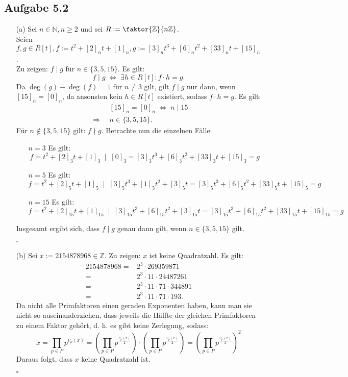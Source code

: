 \documentclass[12pt]{article}
\newcommand{\QED}{\begin{flushright} $\square$ \end{flushright}}
\newcommand{\df}{\enspace\Longrightarrow\enspace}
\newcommand{\gdw}{\;\Longleftrightarrow\;}
\begin{document}
\subsection*{Aufgabe 5.2}
\begin{enumerate}
	\item[(a)] Sei $n\in\mathbb{N},n\geq 2$ und sei $R:=\faktor{\mathbb{Z}}{n\mathbb{Z}}$. \\
	Seien $f,g\in R[t], f:=t^2+[2]_nt+[1]_n, g:=[3]_nt^3+[6]_nt^2+[33]_nt+[15]_n$. \\
	Zu zeigen: $f\mid g$ für $n\in\{3,5,15\}$. Es gilt:
	$$f\mid g \gdw \exists h\in R[t]:f\cdot h=g.$$
	Da $\deg(g)-\deg(f)=1$ für $n\neq 3$ gilt, gilt $f\mid g$ nur dann, wenn $[15]_n=[0]_n$, da ansonsten kein $h\in R[t]$ existiert, sodass $f\cdot h=g$.
	 Es gilt:
	 \begin{align*}
	 	&[15]_n=[0]_n \gdw n\mid 15 \\
	 	\df &n\in\{3,5,15\}.
	 \end{align*}
	 Für $n\notin\{3,5,15\}$ gilt: $f\nmid g$.
	 Betrachte nun die einzelnen Fälle:
	 \begin{enumerate}
	 	\item[\underline{$n=3$}] Es gilt:
	 	$$f=t^2+[2]_3t+[1]_3 \;\mid\; [0]_3=[3]_3t^3+[6]_3t^2+[33]_3t+[15]_3=g$$
	 	
	 	\item[\underline{$n=5$}] Es gilt:
	 	$$f=t^2+[2]_5t+[1]_5 \;\mid\; [3]_5t^3+[1]_5t^2+[3]_5t=[3]_5t^3+[6]_5t^2+[33]_5t+[15]_5=g$$
	 	
	 	\item[\underline{$n=15$}] Es gilt:
	 	$$f=t^2+[2]_{15}t+[1]_{15} \;\mid\; [3]_{15}t^3+[6]_{15}t^2+[3]_{15}t=[3]_{15}t^3+[6]_{15}t^2+[33]_{15}t+[15]_{15}=g$$
	 \end{enumerate}
	 Insgesamt ergibt sich, dass $f\mid g$ genau dann gilt, wenn $n\in\{3,5,15\}$ gilt.
	 \QED
	
	\item[(b)] Sei $x:=2154878968\in\mathbb{Z}$. 
	Zu zeigen: $x$ ist keine Quadratzahl. Es gilt:
	\begin{align*}
		2154878968 =& 2^3\cdot 269359871 \\
		=& 2^3\cdot 11\cdot 24487261 \\
		=& 2^3\cdot 11\cdot 71\cdot 344891 \\
		=& 2^3\cdot 11\cdot 71\cdot 193.
	\end{align*}
	Da nicht alle Primfaktoren einen geraden Exponenten haben, kann man sie nicht so auseinanderziehen, dass jeweils die Hälfte der gleichen Primfaktoren zu einem Faktor gehört, d. h. es gibt keine Zerlegung, sodass:
	$$x=\prod_{p\in P}p^{\upsilon_p(x)}=\left(\prod_{p\in P}p^{\frac{\upsilon_p(x)}{2}}\right)\cdot\left(\prod_{p\in P}p^{\frac{\upsilon_p(x)}{2}}\right)=\left(\prod_{p\in P}p^{\frac{\upsilon_p(x)}{2}}\right)^2$$
	Daraus folgt, dass $x$ keine Quadratzahl ist.
	\QED
\end{enumerate}
\end{document}
